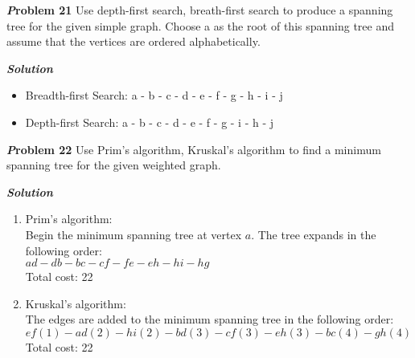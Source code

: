 \documentclass[10pt]{article}
\newcommand{\solution}{\vspace{0.5cm}\textbf{\textit{Solution}} \\}
\begin{document}
\begin{enumerate}[label=(\alph*)]
\end{enumerate}



\textbf{\textit Problem 21}
Use depth-first search, breath-first search to produce a spanning tree for the given simple graph.
Choose a as the root of this spanning tree and assume that the vertices are ordered alphabetically.


\solution
\begin{itemize}
    \item Breadth-first Search: a - b - c - d - e - f - g - h - i - j
    \item Depth-first Search: a - b - c - d - e - f - g - i - h - j
\end{itemize}



\textbf{\textit Problem 22}
Use Prim’s algorithm, Kruskal’s algorithm to find a minimum spanning tree for the given weighted
graph.

\solution
\begin{enumerate}[label=(\alph*)]
    \item Prim's algorithm: \\
    Begin the minimum spanning tree at vertex $a$. The tree expands in the following order: \\
    $ad - db - bc - cf - fe - eh - hi - hg$ \\
    Total cost: 22

    \item Kruskal's algorithm: \\
    The edges are added to the minimum spanning tree in the following order: \\
    $ef(1) - ad(2) - hi(2) - bd(3) - cf(3) - eh(3) - bc(4) - gh(4)$ \\
    Total cost: 22

\end{enumerate}
\end{document}
